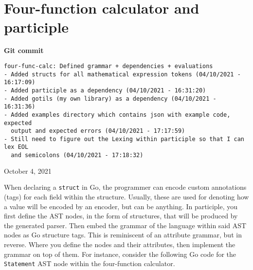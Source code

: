 \section{Four-function calculator and participle}
\label{sec:four-function-calc}

\begin{center}
    \textbf{Git commit}
    \begin{verbatim}
four-func-calc: Defined grammar + dependencies + evaluations
- Added structs for all mathematical expression tokens (04/10/2021 - 16:17:09)
- Added participle as a dependency (04/10/2021 - 16:31:20)
- Added gotils (my own library) as a dependency (04/10/2021 - 16:31:36)
- Added examples directory which contains json with example code, expected
  output and expected errors (04/10/2021 - 17:17:59)
- Still need to figure out the Lexing within participle so that I can lex EOL
  and semicolons (04/10/2021 - 17:18:32)
    \end{verbatim}
    \vspace{-1em}
    \tiny{October 4, 2021}
\end{center}

When declaring a \texttt{struct} in Go, the programmer can encode custom annotations (tags) for each field within the structure. Usually, these are used for denoting how a value will be encoded by an encoder, but can be anything. In participle, you first define the AST nodes, in the form of structures, that will be produced by the generated parser. Then embed the grammar of the language within said AST nodes as Go structure tags. This is reminiscent of an attribute grammar, but in reverse. Where you define the nodes and their attributes, then implement the grammar on top of them. For instance, consider the following Go code for the \verb|Statement| AST node within the four-function calculator.

